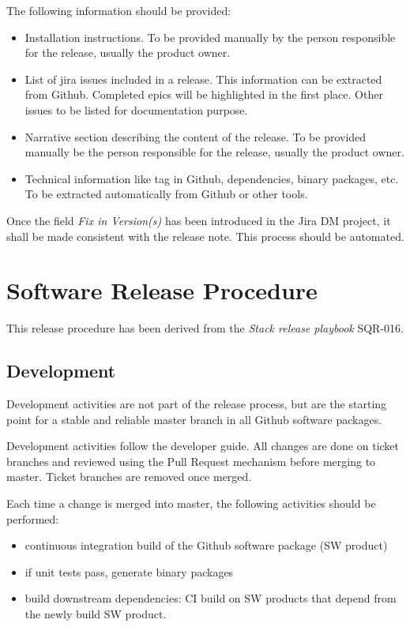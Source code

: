 The following information should be  provided:
\begin{itemize}
\item Installation instructions. To be provided manually by the person responsible for the release, usually the product owner.
\item List of jira issues included in a release. This information can be extracted from Github. Completed epics will be highlighted in the first place. Other issues to be listed for documentation purpose.
\item Narrative section describing the content of the release. To be provided manually be the person responsible for the release, usually the product owner.
\item Technical information like tag in Github, dependencies, binary packages, etc. To be extracted automatically from Github or other tools.
\end{itemize}

Once the field \textit{Fix in Version(s)} has been introduced in the Jira DM project, it shall be made consistent with the release note. This process should be automated.


\newpage
\section{Software Release Procedure} \label{sec:releaseprocedure}

This release procedure has been derived from the \textit{Stack release playbook} SQR-016.

\subsection{Development} \label{sec:dev}

Development activities are not part of the release process, but are the starting point for a stable and reliable master branch in all Github software packages.

Development activities follow the \citep{DevGuide} developer guide. All changes are done on ticket branches and reviewed using the Pull Request mechanism before merging to master.
Ticket branches are removed once merged.

Each time a change is merged into master, the following activities should be performed:

\begin{itemize}
\item continuous integration build of the Github software package (SW product)
\item if unit tests pass, generate binary packages
\item build downstream dependencies: CI build on SW products that depend from the newly build SW product.
\end{itemize}

